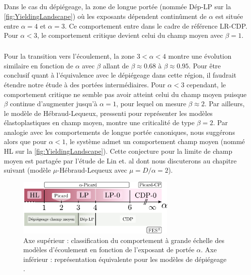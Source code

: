 \subparagraph{}Dans le cas du dépiégeage, la zone de longue portée (nommée Dép-LP sur la \autoref{fig:YieldingLandscape}) où les exposants dépendent continûment de $\alpha$ est située entre $\alpha=4$ et $\alpha=3$. Ce comportement entre dans le cadre de référence LR-CDP. Pour $\alpha<3$, le comportement critique devient celui du champ moyen avec $\beta=1$.

\subparagraph{}Pour la transition vers l'écoulement, la zone $3<\alpha<4$ montre une évolution similaire en fonction de $\alpha$ avec $\beta$ allant de $\beta\approx 0.68$ à $\beta\approx 0.95$. Pour être conclusif quant à l'équivalence avec le dépiégeage dans cette région, il faudrait étendre notre étude à des portées intermédiaires. Pour $\alpha<3$ cependant, le comportement critique ne semble pas avoir atteint celui du champ moyen puisque $\beta$ continue d'augmenter jusqu'à $\alpha=1$, pour lequel on mesure $\beta\approx 2$. Par ailleurs, le modèle de Hébraud-Lequeux, pressenti pour représenter les modèles élastoplastiques en champ moyen, montre une criticalité de type $\beta=2$. Par analogie avec les comportements de longue portée canoniques, nous suggérons alors que pour $\alpha<1$, le système admet un comportement champ moyen (nommé HL sur la \autoref{fig:YieldingLandscape}). Cette conjecture pour la limite de champ moyen est partagée par l'étude de Lin et. al \cite{lin_mean-field_2016} dont nous discuterons au chapitre suivant (modèle $\mu$-Hébraud-Lequeux avec $\mu = D/\alpha = 2$).

\begin{figure}[h]
	\centering
	\includegraphics[width=0.7\textwidth]{Chapitre4/Figures/LonguePortee/axe_alpha.pdf}
	\caption{Axe supérieur : classification du comportement à grande échelle des modèles d'écoulement en fonction de l'exposant de portée $\alpha$. Axe inférieur : représentation équivalente pour les modèles de dépiégeage \cite{cao_localization_2018}.}
	\label{fig:YieldingLandscape}
\end{figure}

